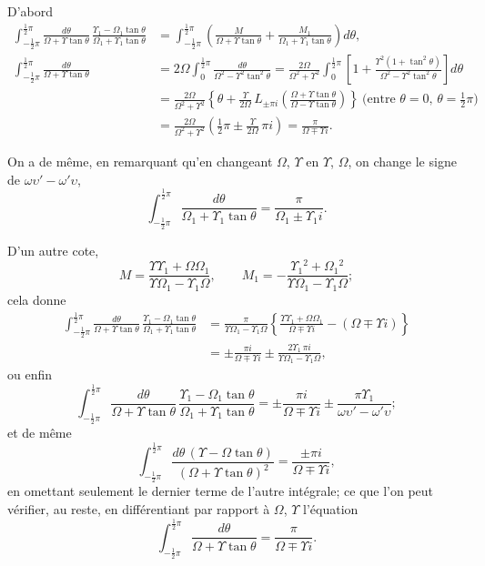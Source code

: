 \documentclass[11pt,a4paper]{article}
\begin{document}
D'abord
\begin{align*}
\int_{-\frac{1}{2}\pi}^{\frac{1}{2}\pi} \frac{d\theta}{\Omega + \Upsilon\tan\theta}\, \frac{\Upsilon_1 - \Omega_1\tan\theta}{\Omega_1 + \Upsilon_1\tan\theta}
&= \int_{-\frac{1}{2}\pi}^{\frac{1}{2}\pi} \left(\frac{M}{\Omega + \Upsilon\tan\theta} + \frac{M_1}{\Omega_1 + \Upsilon_1\tan\theta}\right) d\theta,\\
\int_{-\frac{1}{2}\pi}^{\frac{1}{2}\pi} \frac{d\theta}{\Omega + \Upsilon\tan\theta}
&= 2\Omega \int_0^{\frac{1}{2}\pi} \frac{d\theta}{\Omega^2 - \Upsilon^2\tan^2\theta}
= \frac{2\Omega}{\Omega^2 + \Upsilon^2} \int_0^{\frac{1}{2}\pi} \left[1 + \frac{\Upsilon^2(1 + \tan^2\theta)}{\Omega^2 - \Upsilon^2\tan^2\theta}\right] d\theta\\
&= \frac{2\Omega}{\Omega^2 + \Upsilon^2} \left\{\theta + \frac{\Upsilon}{2\Omega}\, L_{\pm\pi i}\left(\frac{\Omega + \Upsilon\tan\theta}{\Omega - \Upsilon\tan\theta}\right)\right\}\ \text{(entre $\theta = 0$, $\theta = \tfrac{1}{2}\pi$)}\\
&= \frac{2\Omega}{\Omega^2 + \Upsilon^2} \left(\tfrac{1}{2}\pi \pm \frac{\Upsilon}{2\Omega}\, \pi i\right) = \frac{\pi}{\Omega \mp \Upsilon i}.
\end{align*}

On a de m\^eme, en remarquant qu'en changeant $\Omega$, $\Upsilon$ en $\Upsilon$, $\Omega$, on change le signe
de $\omega\upsilon' - \omega'\upsilon$,
\[\int_{-\frac{1}{2}\pi}^{\frac{1}{2}\pi} \frac{d\theta}{\Omega_1 + \Upsilon_1\tan\theta} = \frac{\pi}{\Omega_1 \pm \Upsilon_1 i}.\]

D'un autre cote,
\[M = \frac{\Upsilon\Upsilon_1 + \Omega\Omega_1}{\Upsilon\Omega_1 - \Upsilon_1\Omega},\qquad
M_1 = -\frac{\Upsilon_1{}^2 + \Omega_1{}^2}{\Upsilon\Omega_1 - \Upsilon_1\Omega};\]
cela donne
\begin{align*}
\int_{-\frac{1}{2}\pi}^{\frac{1}{2}\pi} \frac{d\theta}{\Omega + \Upsilon\tan\theta}\, \frac{\Upsilon_1 - \Omega_1\tan\theta}{\Omega_1 + \Upsilon_1\tan\theta}
&= \frac{\pi}{\Upsilon\Omega_1 - \Upsilon_1\Omega} \left\{\frac{\Upsilon\Upsilon_1 + \Omega\Omega_1}{\Omega \mp \Upsilon i} - (\Omega \mp \Upsilon i)\right\}\\
&= \pm \frac{\pi i}{\Omega \mp \Upsilon i} \pm \frac{2\Upsilon_1\, \pi i}{\Upsilon\Omega_1 - \Upsilon_1\Omega},
\end{align*}
ou enfin
\[\int_{-\frac{1}{2}\pi}^{\frac{1}{2}\pi} \frac{d\theta}{\Omega + \Upsilon\tan\theta}\, \frac{\Upsilon_1 - \Omega_1\tan\theta}{\Omega_1 + \Upsilon_1\tan\theta}
= \pm \frac{\pi i}{\Omega \mp \Upsilon i} \pm \frac{\pi\Upsilon_1}{\omega\upsilon' - \omega'\upsilon};\]
et de m\^eme
\[\int_{-\frac{1}{2}\pi}^{\frac{1}{2}\pi} \frac{d\theta\, (\Upsilon - \Omega\tan\theta)}{(\Omega + \Upsilon\tan\theta)^2}
= \frac{\pm \pi i}{\Omega \mp \Upsilon i},\]
en omettant seulement le dernier terme de l'autre int\'egrale; ce que l'on peut v\'erifier,
au reste, en diff\'erentiant par rapport \`a $\Omega$, $\Upsilon$ l'\'equation
\[\int_{-\frac{1}{2}\pi}^{\frac{1}{2}\pi} \frac{d\theta}{\Omega + \Upsilon\tan\theta} = \frac{\pi}{\Omega \mp \Upsilon i}.\]
\end{document}
